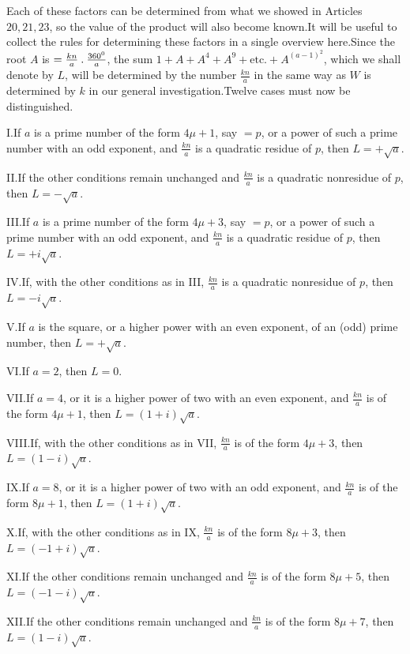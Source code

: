 Each of these factors can be determined from what we showed in Articles $20,21,23$, so the value of the product will also become known.\quad It will be useful to collect the rules for determining these factors in a single overview here.\quad Since the root $A$ is $=\frac{kn}{a}\mathbin{.}\frac{360^0}{a}$, the sum $1+A+A^4+A^9+\text{etc.}+A^{(a-1)^2}$, which we shall denote by $L$, will be determined by the number $\frac{kn}{a}$ in the same way as $W$ is determined by $k$ in our general investigation.\quad Twelve cases must now be distinguished.

I.\quad If $a$ is a prime number of the form $4\mu+1$, say $=p$, or a power of such a prime number with an odd exponent, and $\frac{kn}{a}$ is a quadratic residue of $p$, then $L=+\surd a$.

II.\quad If the other conditions remain unchanged and $\frac{kn}{a}$ is a quadratic nonresidue of $p$, then $L=-\surd a$.

III.\quad If $a$ is a prime number of the form $4\mu+3$, say $=p$, or a power of such a prime number with an odd exponent, and $\frac{kn}{a}$ is a quadratic residue of $p$, then $L=+i\surd a$.

IV.\quad If, with the other conditions as in III, $\frac{kn}{a}$ is a quadratic nonresidue of $p$, then $L=-i\surd a$.

V.\quad If $a$ is the square, or a higher power with an even exponent, of an (odd) prime number, then $L=+\surd a$.

VI.\quad If $a=2$, then $L=0$.

VII.\quad If $a=4$, or it is a higher power of two with an even exponent, and $\frac{kn}{a}$ is of the form $4\mu+1$, then $L=(1+i)\surd a$.

VIII.\quad If, with the other conditions as in VII, $\frac{kn}{a}$ is of the form $4\mu+3$, then $L=(1-i)\surd a$.

IX.\quad If $a=8$, or it is a higher power of two with an odd exponent, and $\frac{kn}{a}$ is of the form $8\mu+1$, then $L=(1+i)\surd a$.


X.\quad If, with the other conditions as in IX, $\frac{kn}{a}$ is of the form $8\mu+3$, then $L=(-1+i)\surd a$.

XI.\quad If the other conditions remain unchanged and $\frac{kn}{a}$ is of the form $8\mu+5$, then $L=(-1-i)\surd a$.

XII.\quad If the other conditions remain unchanged and $\frac{kn}{a}$ is of the form $8\mu+7$, then $L=(1-i)\surd a$.

